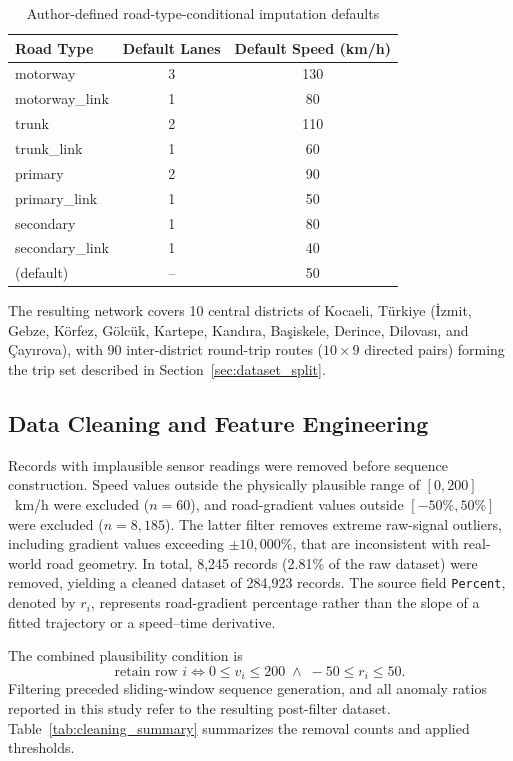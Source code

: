 \documentclass[journal]{IEEEtran}
\begin{document}
\begin{table}[!htbp]
  \centering
  \caption{Author-defined road-type-conditional imputation defaults}
  \label{tab:road_defaults}
  \renewcommand{\arraystretch}{1.15}
  \begin{tabular}{@{}lcc@{}}
    \toprule
    \textbf{Road Type} & \textbf{Default Lanes} & \textbf{Default Speed (km/h)} \\ \midrule
    motorway        & 3  & 130 \\
    motorway\_link  & 1  & 80 \\
    trunk           & 2  & 110 \\
    trunk\_link     & 1  & 60 \\
    primary         & 2  & 90 \\
    primary\_link   & 1  & 50 \\
    secondary       & 1  & 80 \\
    secondary\_link & 1  & 40 \\
    (default)       & -- & 50 \\ \bottomrule
  \end{tabular}
\end{table}

The resulting network covers 10 central districts of Kocaeli, Türkiye (İzmit, Gebze, Körfez, Gölcük, Kartepe, Kandıra, Başiskele, Derince, Dilovası, and Çayırova), with 90 inter-district round-trip routes ($10\times9$ directed pairs) forming the trip set described in Section~\ref{sec:dataset_split}.

\subsection{Data Cleaning and Feature Engineering}
Records with implausible sensor readings were removed before sequence construction. Speed values outside the physically plausible range of $[0,200]$~km/h were excluded ($n=60$), and road-gradient values outside $[-50\%,50\%]$ were excluded ($n=8{,}185$). The latter filter removes extreme raw-signal outliers, including gradient values exceeding $\pm10{,}000\%$, that are inconsistent with real-world road geometry. In total, 8,245 records (2.81\% of the raw dataset) were removed, yielding a cleaned dataset of 284,923 records. The source field \texttt{Percent}, denoted by $r_i$, represents road-gradient percentage rather than the slope of a fitted trajectory or a speed--time derivative.

The combined plausibility condition is
\begin{equation}
  \text{retain row }i \iff 0 \leq v_i \leq 200
  \;\land\; -50 \leq r_i \leq 50.
\end{equation}
Filtering preceded sliding-window sequence generation, and all anomaly ratios reported in this study refer to the resulting post-filter dataset. Table~\ref{tab:cleaning_summary} summarizes the removal counts and applied thresholds.
\end{document}
